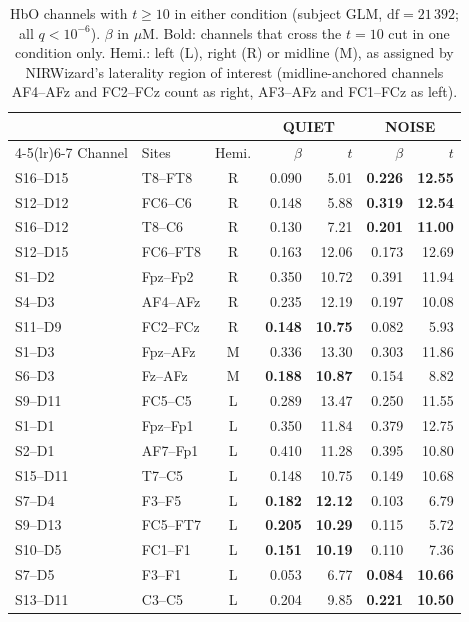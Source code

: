 \documentclass[11pt,a4paper]{article}
\begin{document}
\begin{table}[htbp]
\centering
\small
\caption{HbO channels with $t\ge10$ in either condition (subject GLM,
$\mathrm{df}=21\,392$; all $q<10^{-6}$). $\beta$ in $\mu$M. Bold: channels that
cross the $t=10$ cut in one condition only. Hemi.: left (L), right (R) or
midline (M), as assigned by NIRWizard's laterality region of interest
(midline-anchored channels AF4--AFz and FC2--FCz count as right, AF3--AFz and
FC1--FCz as left).}
\label{tab:t10}
\begin{tabular}{llc rr rr}
\toprule
& & & \multicolumn{2}{c}{QUIET} & \multicolumn{2}{c}{NOISE}\\
\cmidrule(lr){4-5}\cmidrule(lr){6-7}
Channel & Sites & Hemi. & $\beta$ & $t$ & $\beta$ & $t$\\
\midrule
S16--D15 & T8--FT8   & R & 0.090 & 5.01  & \textbf{0.226} & \textbf{12.55}\\
S12--D12 & FC6--C6   & R & 0.148 & 5.88  & \textbf{0.319} & \textbf{12.54}\\
S16--D12 & T8--C6    & R & 0.130 & 7.21  & \textbf{0.201} & \textbf{11.00}\\
S12--D15 & FC6--FT8  & R & 0.163 & 12.06 & 0.173 & 12.69\\
S1--D2   & Fpz--Fp2  & R & 0.350 & 10.72 & 0.391 & 11.94\\
S4--D3   & AF4--AFz  & R & 0.235 & 12.19 & 0.197 & 10.08\\
S11--D9  & FC2--FCz  & R & \textbf{0.148} & \textbf{10.75} & 0.082 & 5.93\\
\addlinespace
S1--D3   & Fpz--AFz  & M & 0.336 & 13.30 & 0.303 & 11.86\\
S6--D3   & Fz--AFz   & M & \textbf{0.188} & \textbf{10.87} & 0.154 & 8.82\\
\addlinespace
S9--D11  & FC5--C5   & L & 0.289 & 13.47 & 0.250 & 11.55\\
S1--D1   & Fpz--Fp1  & L & 0.350 & 11.84 & 0.379 & 12.75\\
S2--D1   & AF7--Fp1  & L & 0.410 & 11.28 & 0.395 & 10.80\\
S15--D11 & T7--C5    & L & 0.148 & 10.75 & 0.149 & 10.68\\
S7--D4   & F3--F5    & L & \textbf{0.182} & \textbf{12.12} & 0.103 & 6.79\\
S9--D13  & FC5--FT7  & L & \textbf{0.205} & \textbf{10.29} & 0.115 & 5.72\\
S10--D5  & FC1--F1   & L & \textbf{0.151} & \textbf{10.19} & 0.110 & 7.36\\
S7--D5   & F3--F1    & L & 0.053 & 6.77  & \textbf{0.084} & \textbf{10.66}\\
S13--D11 & C3--C5    & L & 0.204 & 9.85  & \textbf{0.221} & \textbf{10.50}\\
\bottomrule
\end{tabular}
\end{table}
\end{document}
